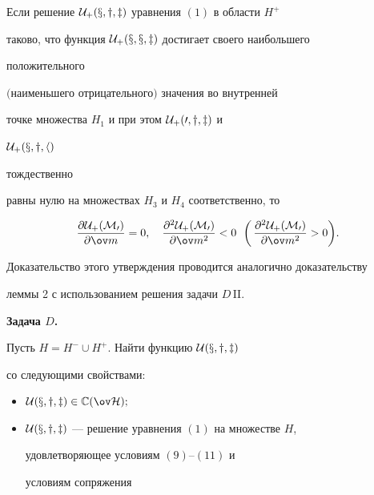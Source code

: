  


\begin{lem} Если решение $\cal U_+(x,y,z)$ уравнения $(1)$ в области $H^+$ 


таково, что функция $\cal U_+(x,x,z)$ достигает своего наибольшего 


положительного 


$($наименьшего отрицательного$)$ значения во внутренней 


точке множества $H_1$ и при этом $\cal U_+(0,y,z)$ и 


$\cal U_+(x,y,h)$ 


тождественно 


равны нулю на множествах $H_3$ и $H_4$ соответственно, то 


$$ 


\frac{\partial\cal U_+(M_0)}{\partial\ov m}=0,\quad 


\frac{\partial^2\cal U_+(M_0)}{\partial\ov m^2}<0 


\ \; \bigg(\, 


\frac{\partial^2\cal U_+(M_0)}{\partial\ov m^2}>0\bigg). 


$$ 


\end{lem} 


 


Доказательство этого утверждения проводится аналогично доказательству 


леммы 2 с использованием решения задачи $D$\,II. 


\medskip 


 


{\bf Задача $D$.} {\it  


Пусть $H=H^-\cup H^+$. Найти функцию $\cal U(x,y,z)$ 


со следующими свойствами$:$ 


\begin{itemize} 


\item[1)] $\cal U(x,y,z)\in\Bbb C(\ov H);$ 


\item[2)] $\cal U(x,y,z)$ --- решение уравнения $(1)$ на множестве $H$, 


удовлетворяющее условиям $(9)$--$(11)$ и 


условиям сопряжения 


\end{itemize}


}


